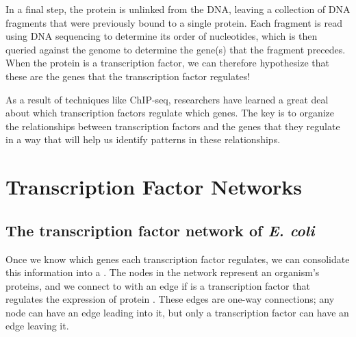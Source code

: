 In a final step, the protein is unlinked from the DNA, leaving a collection of DNA fragments that were previously bound to a single protein. Each fragment is read using DNA sequencing to determine its order of nucleotides, which is then queried against the genome to determine the gene(s) that the fragment precedes. When the protein is a transcription factor, we can therefore hypothesize that these are the genes that the transcription factor regulates!\\

\begin{qbox}\end{qbox}

As a result of techniques like ChIP-seq, researchers have learned a great deal about which transcription factors regulate which genes. The key is to organize the relationships between transcription factors and the genes that they regulate in a way that will help us identify patterns in these relationships.\\


\FloatBarrier
{}

\section{Transcription Factor Networks}
\label{sec:transcription_factor_networks}

\subsection{The transcription factor network of \textit{E. coli}}

Once we know which genes each transcription factor regulates, we can consolidate this information into a . The nodes in the network represent an organism's proteins, and we connect  to  with an edge if  is a transcription factor that regulates the expression of protein . These edges are one-way connections; any node can have an edge leading into it, but only a transcription factor can have an edge leaving it.

